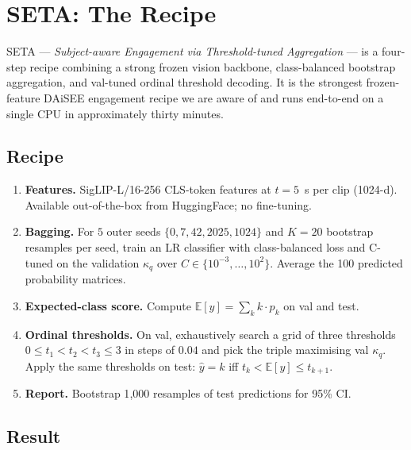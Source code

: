 \section{SETA: The Recipe}
\label{sec:recipe}

SETA --- \emph{Subject-aware Engagement via Threshold-tuned
Aggregation} --- is a four-step recipe combining a strong frozen
vision backbone, class-balanced bootstrap aggregation, and val-tuned
ordinal threshold decoding. It is the strongest frozen-feature
DAiSEE engagement recipe we are aware of and runs end-to-end on a
single CPU in approximately thirty minutes.

\subsection{Recipe}

\begin{enumerate}\itemsep0pt
  \item \textbf{Features.} SigLIP-L/16-256 CLS-token features at
  $t = 5$~s per clip (1024-d). Available out-of-the-box from
  HuggingFace; no fine-tuning.
  \item \textbf{Bagging.} For $5$ outer seeds
  $\{0, 7, 42, 2025, 1024\}$ and $K = 20$ bootstrap resamples per
  seed, train an LR classifier with class-balanced loss and C-tuned
  on the validation $\kappa_q$ over $C \in \{10^{-3},\dots,10^{2}\}$.
  Average the 100 predicted probability matrices.
  \item \textbf{Expected-class score.} Compute
  $\mathbb{E}[y] = \sum_{k} k \cdot p_k$ on val and test.
  \item \textbf{Ordinal thresholds.} On val, exhaustively search a
  grid of three thresholds $0 \leq t_1 < t_2 < t_3 \leq 3$ in
  steps of $0.04$ and pick the triple maximising val $\kappa_q$.
  Apply the same thresholds on test: $\hat y = k$ iff
  $t_k < \mathbb{E}[y] \leq t_{k+1}$.
  \item \textbf{Report.} Bootstrap 1{,}000 resamples of test
  predictions for 95\% CI.
\end{enumerate}

\subsection{Result}

